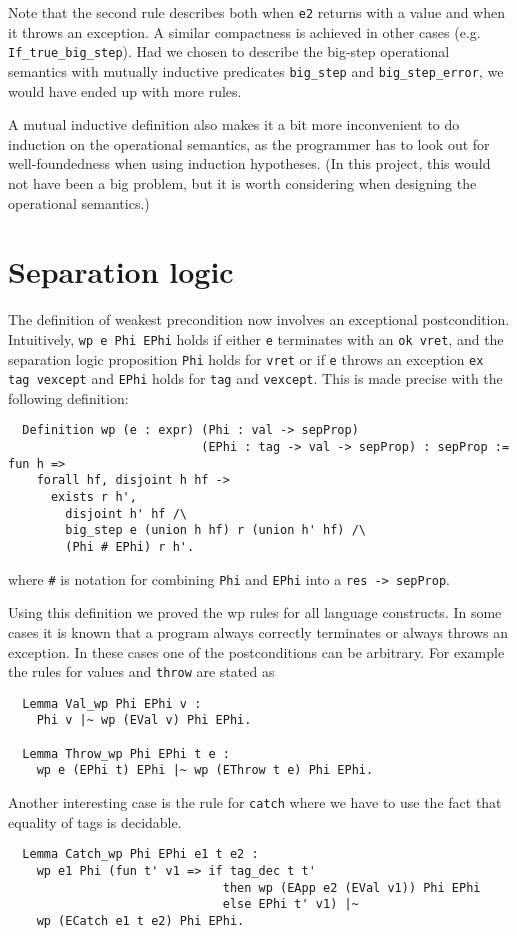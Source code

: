 \documentclass{article}
\begin{document}
Note that the second rule describes both when \texttt{e2} returns with a value and when it throws an exception. A similar compactness is achieved in other cases (e.g. \texttt{If\_true\_big\_step}). Had we chosen to describe the big-step operational semantics with mutually inductive predicates \texttt{big\_step} and \texttt{big\_step\_error}, we would have ended up with more rules. 

A mutual inductive definition also makes it a bit more inconvenient to do induction on the operational semantics, as the programmer has to look out for well-foundedness when using induction hypotheses. (In this project, this would not have been a big problem, but it is worth considering when designing the operational semantics.)

\section{Separation logic}

The definition of weakest precondition now involves an exceptional postcondition. Intuitively, \texttt{wp e Phi EPhi} holds if either \texttt{e} terminates with an \texttt{ok vret}, and the separation logic proposition \texttt{Phi} holds for \texttt{vret} or if \texttt{e} throws an exception \texttt{ex tag vexcept} and \texttt{EPhi} holds for \texttt{tag} and \texttt{vexcept}. This is made precise with the following definition:
\begin{lstlisting}
  Definition wp (e : expr) (Phi : val -> sepProp)
                           (EPhi : tag -> val -> sepProp) : sepProp := fun h =>
    forall hf, disjoint h hf ->
      exists r h',
        disjoint h' hf /\
        big_step e (union h hf) r (union h' hf) /\
        (Phi # EPhi) r h'.
\end{lstlisting}
where \texttt{\#} is notation for combining \texttt{Phi} and \texttt{EPhi} into a \texttt{res -> sepProp}.

Using this definition we proved the wp rules for all language constructs. In some cases it is known that a program always correctly terminates or always throws an exception. In these cases one of the postconditions can be arbitrary. For example the rules for values and \texttt{throw} are stated as
\begin{lstlisting}
  Lemma Val_wp Phi EPhi v :
    Phi v |~ wp (EVal v) Phi EPhi.
  
  Lemma Throw_wp Phi EPhi t e :
    wp e (EPhi t) EPhi |~ wp (EThrow t e) Phi EPhi.
\end{lstlisting}
Another interesting case is the rule for \texttt{catch} where we have to use the fact that equality of tags is decidable.
\begin{lstlisting}
  Lemma Catch_wp Phi EPhi e1 t e2 :
    wp e1 Phi (fun t' v1 => if tag_dec t t'
                              then wp (EApp e2 (EVal v1)) Phi EPhi
                              else EPhi t' v1) |~
    wp (ECatch e1 t e2) Phi EPhi.
\end{lstlisting}
\end{document}
